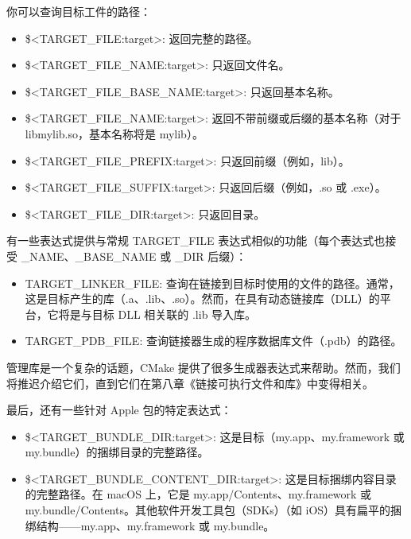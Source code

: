 你可以查询目标工件的路径：

\begin{itemize}
\item
\$<TARGET\_FILE:target>: 返回完整的路径。

\item
\$<TARGET\_FILE\_NAME:target>: 只返回文件名。

\item
\$<TARGET\_FILE\_BASE\_NAME:target>: 只返回基本名称。

\item
\$<TARGET\_FILE\_NAME:target>: 返回不带前缀或后缀的基本名称（对于 libmylib.so，基本名称将是 mylib）。

\item
\$<TARGET\_FILE\_PREFIX:target>: 只返回前缀（例如，lib）。

\item
\$<TARGET\_FILE\_SUFFIX:target>: 只返回后缀（例如，.so 或 .exe）。

\item
\$<TARGET\_FILE\_DIR:target>: 只返回目录。
\end{itemize}

有一些表达式提供与常规 TARGET\_FILE 表达式相似的功能（每个表达式也接受 \_NAME、\_BASE\_NAME 或 \_DIR 后缀）：

\begin{itemize}
\item
TARGET\_LINKER\_FILE: 查询在链接到目标时使用的文件的路径。通常，这是目标产生的库（.a、.lib、.so）。然而，在具有动态链接库（DLL）的平台，它将是与目标 DLL 相关联的 .lib 导入库。

\item
TARGET\_PDB\_FILE: 查询链接器生成的程序数据库文件（.pdb）的路径。
\end{itemize}


管理库是一个复杂的话题，CMake 提供了很多生成器表达式来帮助。然而，我们将推迟介绍它们，直到它们在第八章《链接可执行文件和库》中变得相关。

最后，还有一些针对 Apple 包的特定表达式：

\begin{itemize}
\item
\$<TARGET\_BUNDLE\_DIR:target>: 这是目标（my.app、my.framework 或 my.bundle）的捆绑目录的完整路径。

\item
\$<TARGET\_BUNDLE\_CONTENT\_DIR:target>: 这是目标捆绑内容目录的完整路径。在 macOS 上，它是 my.app/Contents、my.framework 或 my.bundle/Contents。其他软件开发工具包（SDKs）（如 iOS）具有扁平的捆绑结构——my.app、my.framework 或 my.bundle。
\end{itemize}

